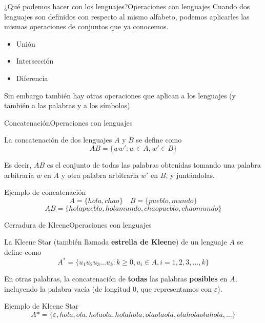 \documentclass[spanish]{beamer}
\begin{document}
\begin{frame}{¿Qué podemos hacer con los lenguajes?}{Operaciones con lenguajes}
    Cuando dos lenguajes son definidos con respecto al mismo alfabeto, podemos aplicarles las mismas operaciones de conjuntos que ya conocemos. \pause
    
    \bigskip

    \begin{itemize}
        \itemsep1.5ex
        \item Unión \pause
        \item Intersección \pause
        \item Diferencia
    \end{itemize}

    \pause
    \bigskip

    Sin embargo también hay otras operaciones que aplican a los lenguajes (y también a las palabras y a los símbolos).
\end{frame}

\begin{frame}{Concatenación}{Operaciones con lenguajes}

    \begin{definition}
        La \alert{concatenación} de dos lenguajes $A$ y $B$ se define como
        \[AB = \{ww' : w \in A, w' \in B\}\]
    \end{definition} \pause

    \bigskip

    Es decir, $AB$ es el conjunto de todas las palabras obtenidas tomando una palabra arbitraria $w$ en $A$ y otra palabra arbitraria $w'$ en $B$, y juntándolas. \pause

    \bigskip

    \begin{exampleblock}{Ejemplo de concatenación}
        \[A = \{hola, chao\} \quad B = \{pueblo,  mundo\}\]
        \[AB = \{holapueblo, holamundo, chaopueblo, chaomundo\}\]
    \end{exampleblock}
\end{frame}

\begin{frame}{Cerradura de Kleene}{Operaciones con lenguajes}

    \begin{definition}
        La \alert{Kleene Star} (también llamada \textbf{estrella de Kleene}) de un lenguaje $A$ se define como
        \[A^{*} = \{u_1 u_2 u_3 \dots u_k : k \geq 0, u_i \in A, i = 1, 2, 3, \dots , k\}\]
    \end{definition} \pause
    
    \bigskip

    En otras palabras, la concatenación de \textbf{todas} las palabras \textbf{posibles} en $A$, incluyendo la \alert{palabra vacía} (de longitud 0, que representamos con $\varepsilon$). \pause

    \bigskip

    \begin{exampleblock}{Ejemplo de Kleene Star}
        \[A* = \{\varepsilon, hola, ola, holaola, holahola, olaolaola, olaholaolahola, \dots \}\]
    \end{exampleblock}
\end{frame}
\end{document}
